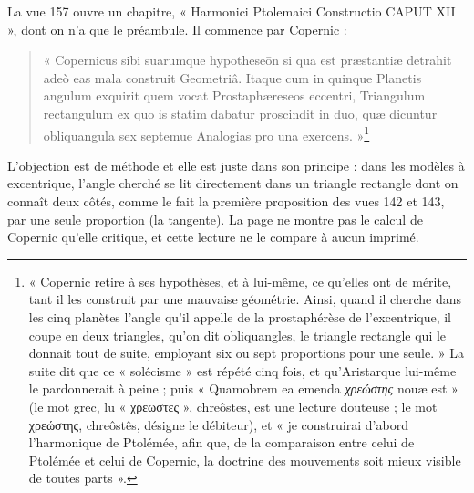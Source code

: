 \documentclass[11pt,a4paper]{article}
\begin{document}
La vue 157 ouvre un chapitre, « Harmonici Ptolemaici Constructio CAPUT XII »,
dont on n'a que le préambule. Il commence par Copernic :

\begin{quote}
« Copernicus sibi suarumque hypotheseōn si qua est præstantiæ detrahit adeò eas
mala construit Geometriâ. Itaque cum in quinque Planetis angulum exquirit quem
vocat Prostaphæreseos eccentri, Triangulum rectangulum ex quo is statim dabatur
proscindit in duo, quæ dicuntur obliquangula sex septemue Analogias pro una
exercens. »\footnote{« Copernic retire à ses hypothèses, et à lui-même, ce
qu'elles ont de mérite, tant il les construit par une mauvaise géométrie. Ainsi,
quand il cherche dans les cinq planètes l'angle qu'il appelle de la
prostaphérèse de l'excentrique, il coupe en deux triangles, qu'on dit
obliquangles, le triangle rectangle qui le donnait tout de suite, employant six
ou sept proportions pour une seule. » La suite dit que ce « solécisme » est répété
cinq fois, et qu'Aristarque lui-même le pardonnerait à peine ; puis « Quamobrem
ea emenda \emph{χρεώστης} nouæ est » (le mot grec, lu « χρεωστες », chreôstes, est
une lecture douteuse ; le mot χρεώστης, chreôstês, désigne le débiteur), et « je construirai d'abord l'harmonique de Ptolémée, afin que, de la
comparaison entre celui de Ptolémée et celui de Copernic, la doctrine des
mouvements soit mieux visible de toutes parts ».}
\end{quote}

L'objection est de méthode et elle est juste dans son principe : dans les modèles
à excentrique, l'angle cherché se lit directement dans un triangle rectangle
dont on connaît deux côtés, comme le fait la première proposition des vues 142
et 143, par une seule proportion (la tangente). La page ne montre pas le calcul
de Copernic qu'elle critique, et cette lecture ne le compare à aucun imprimé.
\end{document}

